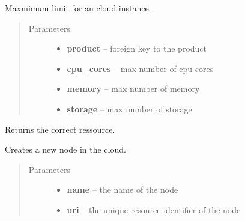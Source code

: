 \documentclass[letterpaper,10pt,english]{sphinxmanual}
\begin{document}

\begin{fulllineitems}
\label{api/cloud:limeade.cloud.models.Limitset}
Maxmimum limit for an cloud instance.
\begin{quote}\begin{description}
\item[{Parameters}] \leavevmode\begin{itemize}
\item {} 
\textbf{product} -- foreign key to the product

\item {} 
\textbf{cpu\_cores} -- max number of cpu cores

\item {} 
\textbf{memory} -- max number of memory

\item {} 
\textbf{storage} -- max number of storage

\end{itemize}

\end{description}\end{quote}

\begin{fulllineitems}
\label{api/cloud:limeade.cloud.models.Limitset.utilization}
Returns the correct ressource.

\end{fulllineitems}


\end{fulllineitems}


\begin{fulllineitems}
\label{api/cloud:limeade.cloud.models.Node}
Creates a new node in the cloud.
\begin{quote}\begin{description}
\item[{Parameters}] \leavevmode\begin{itemize}
\item {} 
\textbf{name} -- the name of the node

\item {} 
\textbf{uri} -- the unique resource identifier of the node

\end{itemize}

\end{description}\end{quote}

\end{fulllineitems}
\end{document}
